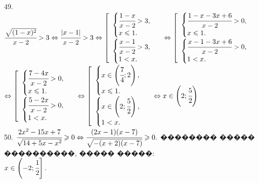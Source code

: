 \documentclass[12pt]{article}
\begin{document}
49. $\cfrac{\sqrt{(1-x)^2}}{x-2}>3\Leftrightarrow\cfrac{|x-1|}{x-2}>3\Leftrightarrow\left[\begin{array}{l} \begin{cases} \cfrac{1-x}{x-2}>3,\\
x\leqslant1.\end{cases}\\ \begin{cases} \cfrac{x-1}{x-2}>3,\\ 1<x.\end{cases}\end{array}\right.\Leftrightarrow\left[\begin{array}{l} \begin{cases} \cfrac{1-x-3x+6}{x-2}>0,\\ x\leqslant1.\end{cases}\\ \begin{cases} \cfrac{x-1-3x+6}{x-2}>0,\\ 1<x.\end{cases}\end{array}\right.$\\$\Leftrightarrow\left[\begin{array}{l} \begin{cases} \cfrac{7-4x}{x-2}>0,\\ x\leqslant1.\end{cases}\\ \begin{cases} \cfrac{5-2x}{x-2}>0,\\ 1<x.\end{cases}\end{array}\right.\Leftrightarrow\left[\begin{array}{l} \begin{cases} x\in\left(\cfrac{7}{4};2\right),\\ x\leqslant1.\end{cases}\\ \begin{cases} x\in\left(2;\cfrac{5}{2}\right),\\ 1<x.\end{cases}\end{array}\right.\Leftrightarrow x\in\left(2;\cfrac{5}{2}\right)$\\
50. $\cfrac{2x^2-15x+7}{\sqrt{14+5x-x^2}}\geqslant0\Leftrightarrow\cfrac{(2x-1)(x-7)}{\sqrt{-(x+2)(x-7)}}\geqslant0.$ �������� ����� ����������, ����� �����:\\ $x\in\left(-2;\cfrac{1}{2}\right].$
\begin{figure}[ht!]
\end{figure}\\
\end{document}
